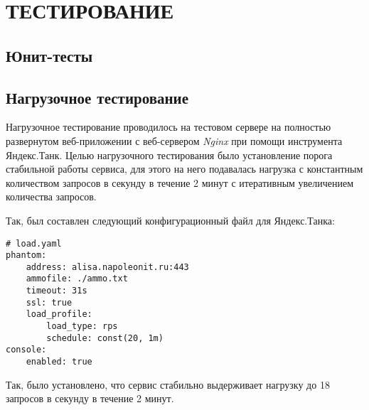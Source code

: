 \section{ТЕСТИРОВАНИЕ}
    \subsection{Юнит-тесты}


    \subsection{Нагрузочное тестирование}
    Нагрузочное тестирование проводилось на тестовом сервере на полностью
    развернутом веб-приложении с веб-сервером \textit{Nginx} при помощи
    инструмента Яндекс.Танк. Целью нагрузочного тестирования было установление
    порога стабильной работы сервиса, для этого на него подавалась нагрузка
    с константным количеством запросов в секунду в течение 2 минут с итеративным
    увеличением количества запросов.

    Так, был составлен следующий конфигурационный файл для Яндекс.Танка:
    \begin{lstlisting}
# load.yaml
phantom:
    address: alisa.napoleonit.ru:443
    ammofile: ./ammo.txt
    timeout: 31s
    ssl: true
    load_profile:
        load_type: rps 
        schedule: const(20, 1m)
console:
    enabled: true 
    \end{lstlisting}

    Так, было установлено, что сервис стабильно выдерживает нагрузку до 18
    запросов в секунду в течение 2 минут.
